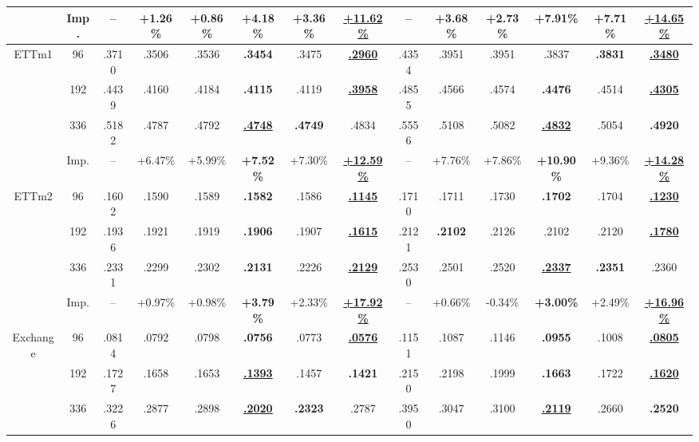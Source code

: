 \documentclass{article}
\begin{document}
\begin{table}[t]
{\begin{tabular}{cc*{12}{c}}
 & Imp. & -- & +1.26\% & +0.86\% & \textbf{+4.18\%} & +3.36\% & \underline{\textbf{+11.62\%}} & -- & +3.68\% & +2.73\% & \textbf{+7.91\%} & +7.71\% & \underline{\textbf{+14.65\%}} \\
\midrule
\multirow{4}{*}{ETTm1} & 96 & .3710 & .3506 & .3536 & \textbf{.3454} & .3475 & \underline{\textbf{.2960}} & .4354 & .3951 & .3951 & .3837 & \textbf{.3831} & \underline{\textbf{.3480}} \\
 & 192 & .4439 & .4160 & .4184 & \textbf{.4115} & .4119 & \underline{\textbf{.3958}} & .4855 & .4566 & .4574 & \textbf{.4476} & .4514 & \underline{\textbf{.4305}} \\
 & 336 & .5182 & .4787 & .4792 & \underline{\textbf{.4748}} & \textbf{.4749} & .4834 & .5556 & .5108 & .5082 & \underline{\textbf{.4832}} & .5054 & \textbf{.4920} \\
 & Imp. & -- & +6.47\% & +5.99\% & \textbf{+7.52\%} & +7.30\% & \underline{\textbf{+12.59\%}} & -- & +7.76\% & +7.86\% & \textbf{+10.90\%} & +9.36\% & \underline{\textbf{+14.28\%}} \\
\midrule
\multirow{4}{*}{ETTm2} & 96 & .1602 & .1590 & .1589 & \textbf{.1582} & .1586 & \underline{\textbf{.1145}} & .1710 & .1711 & .1730 & \textbf{.1702} & .1704 & \underline{\textbf{.1230}} \\
 & 192 & .1936 & .1921 & .1919 & \textbf{.1906} & .1907 & \underline{\textbf{.1615}} & .2121 & \textbf{.2102} & .2126 & .2102 & .2120 & \underline{\textbf{.1780}} \\
 & 336 & .2331 & .2299 & .2302 & \textbf{.2131} & .2226 & \underline{\textbf{.2129}} & .2530 & .2501 & .2520 & \underline{\textbf{.2337}} & \textbf{.2351} & .2360 \\
 & Imp. & -- & +0.97\% & +0.98\% & \textbf{+3.79\%} & +2.33\% & \underline{\textbf{+17.92\%}} & -- & +0.66\% & -0.34\% & \textbf{+3.00\%} & +2.49\% & \underline{\textbf{+16.96\%}} \\
\midrule
\multirow{4}{*}{Exchange} & 96 & .0814 & .0792 & .0798 & \textbf{.0756} & .0773 & \underline{\textbf{.0576}} & .1151 & .1087 & .1146 & \textbf{.0955} & .1008 & \underline{\textbf{.0805}} \\
 & 192 & .1727 & .1658 & .1653 & \underline{\textbf{.1393}} & .1457 & \textbf{.1421} & .2150 & .2198 & .1999 & \textbf{.1663} & .1722 & \underline{\textbf{.1620}} \\
 & 336 & .3226 & .2877 & .2898 & \underline{\textbf{.2020}} & \textbf{.2323} & .2787 & .3950 & .3047 & .3100 & \underline{\textbf{.2119}} & .2660 & \textbf{.2520} \\

\end{tabular}}
\end{table}
\end{document}
